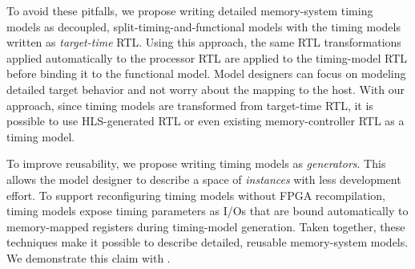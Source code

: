 To avoid these pitfalls, we propose writing detailed memory-system
timing models as decoupled, split-timing-and-functional models with
the timing models written as \emph{target-time} RTL. Using this
approach, the same RTL transformations applied automatically to the
processor RTL are applied to the timing-model RTL before binding it to
the functional model.  Model designers can focus on modeling detailed
target behavior and not worry about the mapping to the host.  With our
approach, since timing models are transformed from target-time RTL, it
is possible to use HLS-generated RTL or even existing
memory-controller RTL as a timing model.

To improve reusability, we propose writing timing models
as \emph{generators}.  This allows the model designer to describe a
space of \emph{instances} with less development effort.  To
support reconfiguring timing models without FPGA recompilation, timing
models expose timing parameters as I/Os that are bound automatically
to memory-mapped registers during timing-model generation.  Taken
together, these techniques make it possible to describe
detailed, reusable memory-system models.  We demonstrate this claim with \PNAME.
